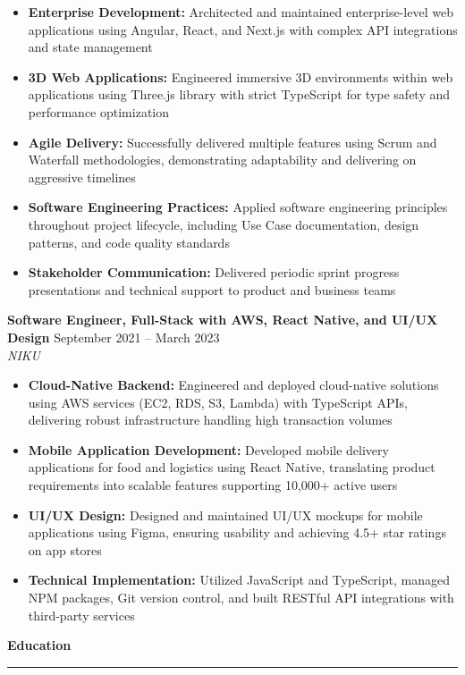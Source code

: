 \documentclass[10pt]{article}
\renewcommand{\section}[1]{%
    \vspace{6pt}
    {\large\bfseries #1}
    \vspace{2pt}
    \hrule
    \vspace{4pt}
}
\newcommand{\entry}[4]{%
    \textbf{#1} \hfill #2\\
    \textit{#3} \hfill #4\\
    \vspace{2pt}
}
\begin{document}
\begin{itemize}[leftmargin=*]
    \item \textbf{Enterprise Development:} Architected and maintained enterprise-level web applications using Angular, React, and Next.js with complex API integrations and state management
    \item \textbf{3D Web Applications:} Engineered immersive 3D environments within web applications using Three.js library with strict TypeScript for type safety and performance optimization
    \item \textbf{Agile Delivery:} Successfully delivered multiple features using Scrum and Waterfall methodologies, demonstrating adaptability and delivering on aggressive timelines
    \item \textbf{Software Engineering Practices:} Applied software engineering principles throughout project lifecycle, including Use Case documentation, design patterns, and code quality standards
    \item \textbf{Stakeholder Communication:} Delivered periodic sprint progress presentations and technical support to product and business teams
\end{itemize}

\entry{Software Engineer, Full-Stack with AWS, React Native, and UI/UX Design}{September 2021 -- March 2023}{NIKU}{}

\begin{itemize}[leftmargin=*]
    \item \textbf{Cloud-Native Backend:} Engineered and deployed cloud-native solutions using AWS services (EC2, RDS, S3, Lambda) with TypeScript APIs, delivering robust infrastructure handling high transaction volumes
    \item \textbf{Mobile Application Development:} Developed mobile delivery applications for food and logistics using React Native, translating product requirements into scalable features supporting 10,000+ active users
    \item \textbf{UI/UX Design:} Designed and maintained UI/UX mockups for mobile applications using Figma, ensuring usability and achieving 4.5+ star ratings on app stores
    \item \textbf{Technical Implementation:} Utilized JavaScript and TypeScript, managed NPM packages, Git version control, and built RESTful API integrations with third-party services
\end{itemize}

\section{Education}
\end{document}
